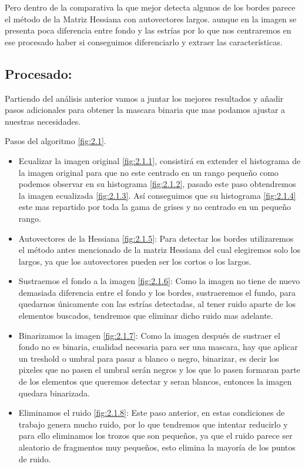 Pero dentro de la comparativa la que mejor detecta algunos de los bordes parece el método de la Matriz Hessiana con autovectores largos. aunque en la imagen se presenta poca diferencia entre fondo y las estrías por lo que nos centraremos en ese procesado haber si conseguimos diferenciarlo y extraer las características.

\subsection{Procesado:}
Partiendo del análisis anterior vamos a juntar los mejores resultados y añadir pasos adicionales para obtener la mascara binaria que mas podamos ajustar a nuestras necesidades.


Pasos del algoritmo \ref{fig:2.1}.
\begin{itemize}
	\item Ecualizar la imagen original \ref{fig:2.1.1}, consistirá en extender el histograma de la imagen original para que no este centrado en un rango pequeño como podemos observar en su histograma \ref{fig:2.1.2}, pasado este paso obtendremos la imagen ecualizada \ref{fig:2.1.3}.
Así conseguimos que su histograma \ref{fig:2.1.4} este mas repartido por toda la gama de grises y no centrado en un pequeño rango.
	\item Autovectores de la Hessiana \ref{fig:2.1.5}:
Para detectar los bordes utilizaremos el método antes mencionado de la matriz Hessiana del cual elegiremos solo los largos, ya que los autovectores pueden ser los cortos o los largos. 
	\item Sustraemos el fondo a la imagen \ref{fig:2.1.6}:
Como la imagen no tiene de nuevo demasiada diferencia entre el fondo y los bordes, sustraeremos el fundo, para quedarnos únicamente con las estrías detectadas, al tener ruido aparte de los elementos buscados, tendremos que eliminar dicho ruido mas adelante.
	\item Binarizamos la imagen \ref{fig:2.1.7}:
Como la imagen después de sustraer el fondo no es binaria, cualidad necesaria para ser una mascara, hay que aplicar un treshold o umbral para pasar a blanco o negro, binarizar, es decir los pixeles que no pasen el umbral serán negros y los que lo pasen formaran parte de los elementos que queremos detectar y seran blancos, entonces la imagen quedara binarizada.
	\item Eliminamos el ruido \ref{fig:2.1.8}:
Este paso anterior, en estas condiciones de trabajo genera mucho ruido, por lo que tendremos que intentar reducirlo y para ello eliminamos los trozos que son pequeños, ya que el ruido parece ser aleatorio de fragmentos muy pequeños, esto elimina la mayoría de los puntos de ruido.

\end{itemize}
